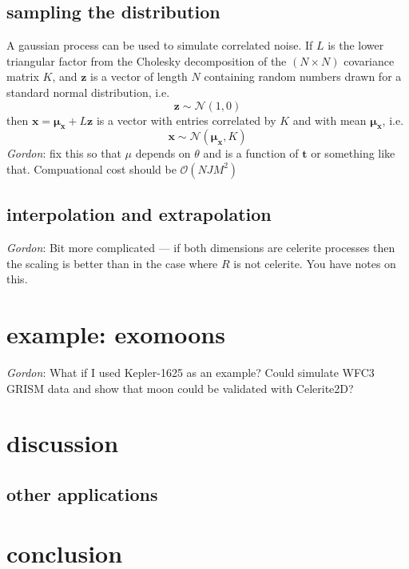 \documentclass[modern]{aastex62}
\newcommand{\todo}[3]{{\color{#2}\emph{#1}: #3}}
\newcommand{\gordontodo}[1]{\todo{Gordon}{red}{#1}}
\newcommand{\bvec}[1]{{\ensuremath{\boldsymbol{#1}}}}
\begin{document}
	\subsection{sampling the distribution}
	A gaussian process can be used to simulate correlated noise. If $L$ is the lower triangular factor from the Cholesky decomposition of the 
	$(N\times N)$ covariance matrix $K$, and $\bvec{z}$ is a vector of length $N$ containing random numbers drawn for a standard normal distribution, i.e.
	\begin{equation}
		\bvec{z} \sim \mathcal{N}(1, 0)
	\end{equation}
	then $\bvec{x} = \bvec{\mu_x} + L\bvec{z}$ is a vector with entries correlated by $K$ and with mean $\bvec{\mu_x}$, i.e.
	\begin{equation}
		\bvec{x} \sim \mathcal{N}(\bvec{\mu_x}, K)
	\end{equation}
	\gordontodo{fix this so that $\mu$ depends on $\theta$ and is a function of $\bvec{t}$ or something like that. Compuational cost should be $\mathcal{O}(NJM^2)$}
	
	\subsection{interpolation and extrapolation}	
	\gordontodo{Bit more complicated --- if both dimensions are celerite processes then the scaling is better than in the case where $R$ is not celerite. You have notes on this.}
	
\section{example: exomoons}
	\gordontodo{What if I used Kepler-1625 as an example? Could simulate WFC3 GRISM data and show that moon could be validated with Celerite2D?}

\section{discussion}
	\subsection{other applications}

\section{conclusion}

\acknowledgments
\end{document}
